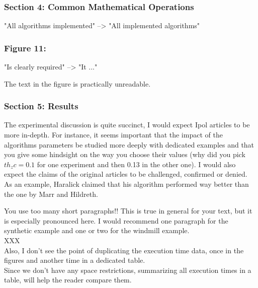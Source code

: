 \documentclass[a4paper,10pt]{report}
\begin{document}
\subsubsection{ Section 4: Common Mathematical Operations}
"All algorithms implemented" --> "All implemented algorithms"

\subsubsection{ Figure 11:}
"Is clearly required" --> "It ..."

The text in the figure is practically unreadable.


\subsubsection{ Section 5: Results}
The experimental discussion is quite succinct, I would expect Ipol articles to
be more in-depth. For instance, it seems important that the impact of the
algorithms parameters be studied more deeply with dedicated examples and that
you give some hindsight on the way you choose their values (why did you pick
$th_zc=0.1$ for one experiment and then 0.13 in the other one). I would
also expect the claims of the original
articles to be challenged, confirmed or denied. As an example, Haralick claimed
that his algorithm performed way better than the one by Marr and Hildreth.

\que You use too many short paragraphs!! This is true in general for your text, but
it is especially pronounced here. I would recommend one paragraph for the synthetic example and one or two for the windmill example.\\

\ans XXX\\

\que Also, I don't see the point of duplicating the execution time data, once in the figures and another time in a dedicated table.\\

\ans Since we don't have any space restrictions, summarizing all execution times in a table, will help the reader compare them.
\end{document}
